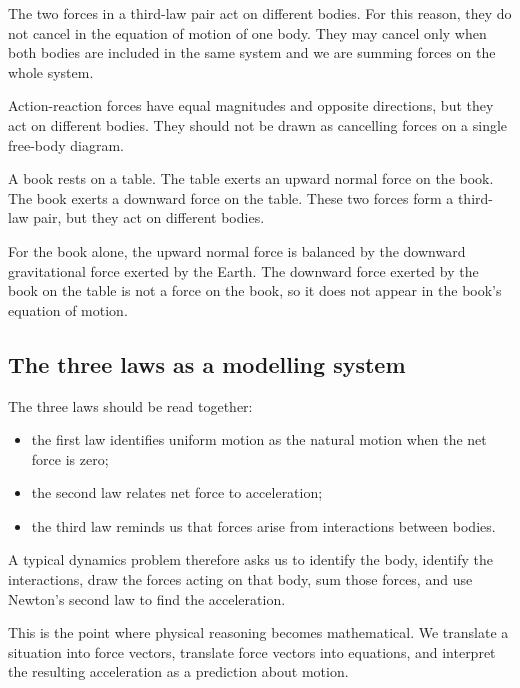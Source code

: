 The two forces in a third-law pair act on different bodies. For this reason, they do not cancel in the equation of motion of one body. They may cancel only when both bodies are included in the same system and we are summing forces on the whole system.

\begin{remarkbox}
Action-reaction forces have equal magnitudes and opposite directions, but they act on different bodies. They should not be drawn as cancelling forces on a single free-body diagram.
\end{remarkbox}

\begin{examplebox}
A book rests on a table. The table exerts an upward normal force on the book. The book exerts a downward force on the table. These two forces form a third-law pair, but they act on different bodies.

For the book alone, the upward normal force is balanced by the downward gravitational force exerted by the Earth. The downward force exerted by the book on the table is not a force on the book, so it does not appear in the book's equation of motion.
\end{examplebox}

\subsection{The three laws as a modelling system}

The three laws should be read together:
\begin{itemize}
\item the first law identifies uniform motion as the natural motion when the net force is zero;
\item the second law relates net force to acceleration;
\item the third law reminds us that forces arise from interactions between bodies.
\end{itemize}

A typical dynamics problem therefore asks us to identify the body, identify the interactions, draw the forces acting on that body, sum those forces, and use Newton's second law to find the acceleration.

This is the point where physical reasoning becomes mathematical. We translate a situation into force vectors, translate force vectors into equations, and interpret the resulting acceleration as a prediction about motion.
